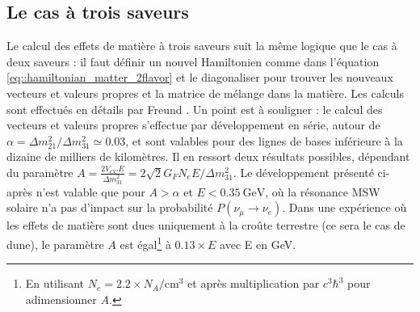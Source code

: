     \subsection{Le cas à trois saveurs}\label{sec::3flavor_matter}
      Le calcul des effets de matière à trois saveurs suit la même logique que le cas à deux saveurs : il faut définir un nouvel Hamiltonien comme dans l'équation \eqref{eq::hamiltonian_matter_2flavor} et le diagonaliser pour trouver les nouveaux vecteurs et valeurs propres et la matrice de mélange dans la matière. Les calculs sont effectués en détails par Freund \cite{Freund2001}. Un point est à souligner : le calcul des vecteurs et valeurs propres s'effectue par développement en série, autour de $\alpha=\Delta m^2_{21}/\Delta m^2_{31}\simeq0.03$, et sont valables pour des lignes de bases inférieure à la dizaine de milliers de kilomètres. Il en ressort deux résultats possibles, dépendant du paramètre $A=\frac{2V_{CC}E}{\Delta m^2_{31}}=2\sqrt{2}G_F N_eE/\Delta m^2_{31}$.  Le développement présenté ci-après n'est valable que pour $A>\alpha$ et  $E<\SI{0.35}{\giga\electronvolt}$, où la résonance MSW solaire n'a pas d'impact sur la probabilité $P(\nu_{\mu}\to\nu_e)$\cite{Freund2001}. Dans une expérience où les effets de matière sont dues uniquement à la croûte terrestre (ce sera le cas de \gls{dune}), le paramètre $A$ est égal\footnote{En utilisant $N_e=2.2\times N_A\si{\per\centi\meter^3}$\cite{pdg2018} et après multiplication par $c^3\hbar^3$ pour adimensionner $A$.} à $0.13\times E$ avec E en \si{\giga\electronvolt}.

